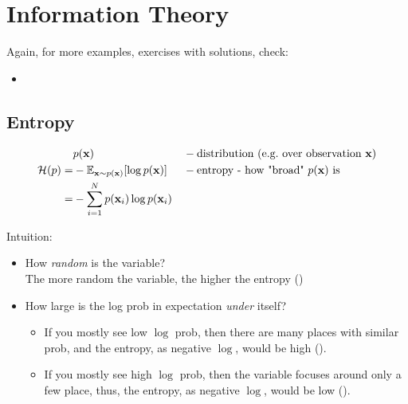 \chapter{Information Theory}
\label{cha:information-theory}
Again, for more examples, exercises with solutions, check:
\begin{itemize}
	\item {}
\end{itemize}

\section{Entropy}
\begin{align}
	&p(\textbf{x}) &&-\text{distribution (\eg over observation $\textbf{x}$)}\\
	\mathcal{H}(p) =& -\mathbb{E}_{\textbf{x}\sim p(\textbf{x})} [\log p(\textbf{x})] &&-\text{entropy - how "broad" $p(\textbf{x})$ is}\\
	=& - \sum_{i=1}^{N} p(\textbf{x}_i) \log p(\textbf{x}_i)
\end{align}

Intuition:
\begin{itemize}
	\item How \textit{random} is the variable?\\
	The more random the variable, the higher the entropy ()
	\item How large is the log \ac{prob} in expectation \textit{under} itself?
	\begin{itemize}
		\item If you mostly see low $\log$ \ac{prob}, then there are many places with similar \ac{prob}, and the entropy, as negative $\log$, would be high ().
		\item If you mostly see high $\log$ \ac{prob}, then the variable focuses around only a few place, thus, the entropy, as negative $\log$, would be low ().
	\end{itemize}	
\end{itemize}

